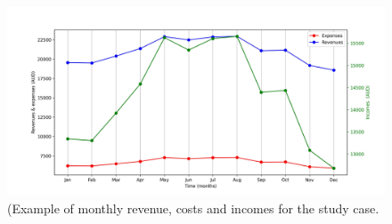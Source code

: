 \documentclass{article}
\begin{document}
 \begin{figure}
 \begin{center}
\includegraphics[angle=0, scale=0.5]{graphics/Fig_Year.jpg}
\caption{(Example of monthly revenue, costs and incomes for the study case.}
\end{center}
\end{figure}



%
%
\end{document}
